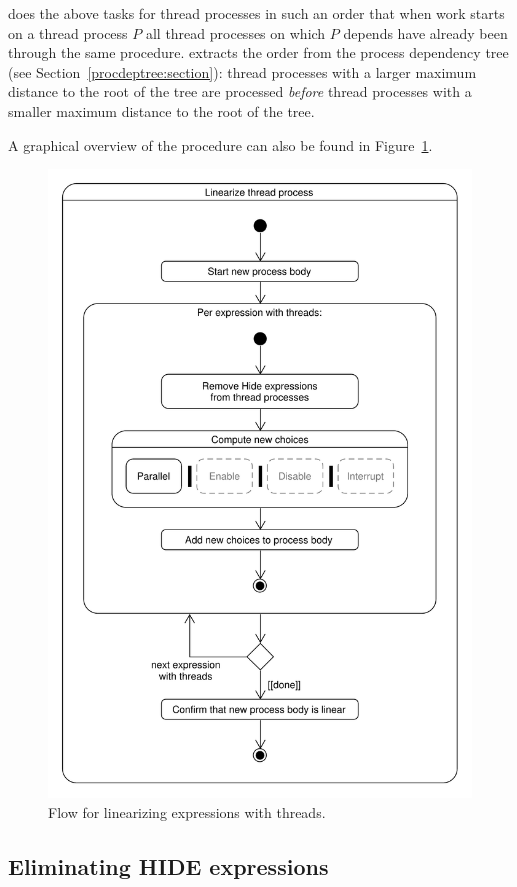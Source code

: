 \lpeq{} does the above tasks for thread processes in such an order that when work starts on a thread process $P$ all thread processes on which $P$ depends have already been through the same procedure.
\lpeq{} extracts the order from the process dependency tree (see Section~\ref{procdeptree:section}): thread processes with a larger maximum distance to the root of the tree are processed \emph{before} thread processes with a smaller maximum distance to the root of the tree.

A graphical overview of the procedure can also be found in Figure~\ref{pbranch-flow:fig}.

\begin{figure}[!ht]
\begin{center}
\includegraphics[width=0.8\linewidth]{umlet/linearization-pbranch-flow}
\caption{Flow for linearizing expressions with threads.}
\label{pbranch-flow:fig}
\end{center}
\end{figure}

\subsection{Eliminating HIDE expressions}

